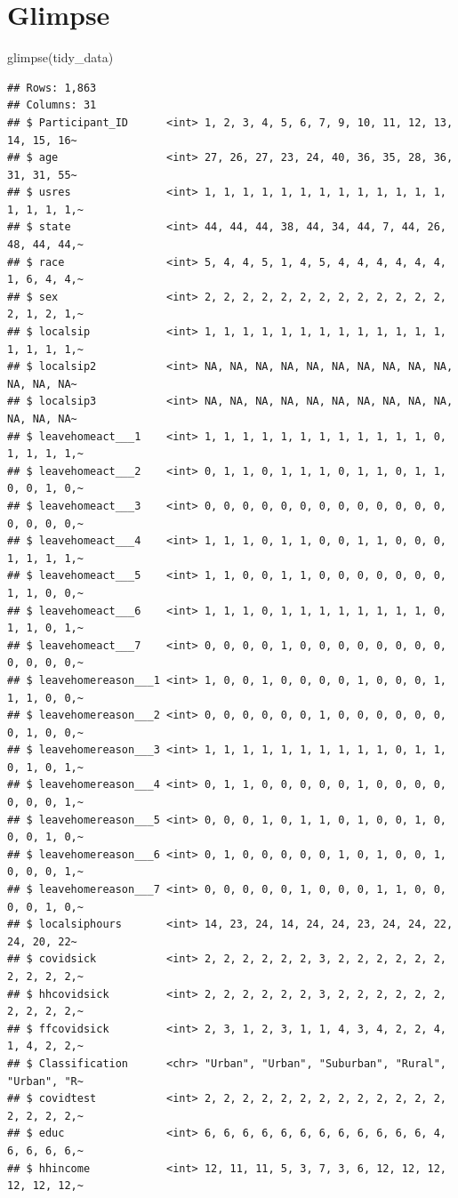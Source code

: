 \documentclass[
  11 pt,
]{article}
\newenvironment{Shaded}{\begin{snugshade}}{\end{snugshade}}
\newcommand{\FunctionTok}[1]{\textcolor[rgb]{0.00,0.00,0.00}{#1}}
\newcommand{\NormalTok}[1]{#1}
\begin{document}
\hypertarget{glimpse}{%
\section{Glimpse}\label{glimpse}}

\begin{Shaded}
\begin{Highlighting}[]
\FunctionTok{glimpse}\NormalTok{(tidy\_data)}
\end{Highlighting}
\end{Shaded}

\begin{verbatim}
## Rows: 1,863
## Columns: 31
## $ Participant_ID      <int> 1, 2, 3, 4, 5, 6, 7, 9, 10, 11, 12, 13, 14, 15, 16~
## $ age                 <int> 27, 26, 27, 23, 24, 40, 36, 35, 28, 36, 31, 31, 55~
## $ usres               <int> 1, 1, 1, 1, 1, 1, 1, 1, 1, 1, 1, 1, 1, 1, 1, 1, 1,~
## $ state               <int> 44, 44, 44, 38, 44, 34, 44, 7, 44, 26, 48, 44, 44,~
## $ race                <int> 5, 4, 4, 5, 1, 4, 5, 4, 4, 4, 4, 4, 4, 1, 6, 4, 4,~
## $ sex                 <int> 2, 2, 2, 2, 2, 2, 2, 2, 2, 2, 2, 2, 2, 2, 1, 2, 1,~
## $ localsip            <int> 1, 1, 1, 1, 1, 1, 1, 1, 1, 1, 1, 1, 1, 1, 1, 1, 1,~
## $ localsip2           <int> NA, NA, NA, NA, NA, NA, NA, NA, NA, NA, NA, NA, NA~
## $ localsip3           <int> NA, NA, NA, NA, NA, NA, NA, NA, NA, NA, NA, NA, NA~
## $ leavehomeact___1    <int> 1, 1, 1, 1, 1, 1, 1, 1, 1, 1, 1, 1, 0, 1, 1, 1, 1,~
## $ leavehomeact___2    <int> 0, 1, 1, 0, 1, 1, 1, 0, 1, 1, 0, 1, 1, 0, 0, 1, 0,~
## $ leavehomeact___3    <int> 0, 0, 0, 0, 0, 0, 0, 0, 0, 0, 0, 0, 0, 0, 0, 0, 0,~
## $ leavehomeact___4    <int> 1, 1, 1, 0, 1, 1, 0, 0, 1, 1, 0, 0, 0, 1, 1, 1, 1,~
## $ leavehomeact___5    <int> 1, 1, 0, 0, 1, 1, 0, 0, 0, 0, 0, 0, 0, 1, 1, 0, 0,~
## $ leavehomeact___6    <int> 1, 1, 1, 0, 1, 1, 1, 1, 1, 1, 1, 1, 0, 1, 1, 0, 1,~
## $ leavehomeact___7    <int> 0, 0, 0, 0, 1, 0, 0, 0, 0, 0, 0, 0, 0, 0, 0, 0, 0,~
## $ leavehomereason___1 <int> 1, 0, 0, 1, 0, 0, 0, 0, 1, 0, 0, 0, 1, 1, 1, 0, 0,~
## $ leavehomereason___2 <int> 0, 0, 0, 0, 0, 0, 1, 0, 0, 0, 0, 0, 0, 0, 1, 0, 0,~
## $ leavehomereason___3 <int> 1, 1, 1, 1, 1, 1, 1, 1, 1, 1, 0, 1, 1, 0, 1, 0, 1,~
## $ leavehomereason___4 <int> 0, 1, 1, 0, 0, 0, 0, 0, 1, 0, 0, 0, 0, 0, 0, 0, 1,~
## $ leavehomereason___5 <int> 0, 0, 0, 1, 0, 1, 1, 0, 1, 0, 0, 1, 0, 0, 0, 1, 0,~
## $ leavehomereason___6 <int> 0, 1, 0, 0, 0, 0, 0, 1, 0, 1, 0, 0, 1, 0, 0, 0, 1,~
## $ leavehomereason___7 <int> 0, 0, 0, 0, 0, 1, 0, 0, 0, 1, 1, 0, 0, 0, 0, 1, 0,~
## $ localsiphours       <int> 14, 23, 24, 14, 24, 24, 23, 24, 24, 22, 24, 20, 22~
## $ covidsick           <int> 2, 2, 2, 2, 2, 2, 3, 2, 2, 2, 2, 2, 2, 2, 2, 2, 2,~
## $ hhcovidsick         <int> 2, 2, 2, 2, 2, 2, 3, 2, 2, 2, 2, 2, 2, 2, 2, 2, 2,~
## $ ffcovidsick         <int> 2, 3, 1, 2, 3, 1, 1, 4, 3, 4, 2, 2, 4, 1, 4, 2, 2,~
## $ Classification      <chr> "Urban", "Urban", "Suburban", "Rural", "Urban", "R~
## $ covidtest           <int> 2, 2, 2, 2, 2, 2, 2, 2, 2, 2, 2, 2, 2, 2, 2, 2, 2,~
## $ educ                <int> 6, 6, 6, 6, 6, 6, 6, 6, 6, 6, 6, 6, 4, 6, 6, 6, 6,~
## $ hhincome            <int> 12, 11, 11, 5, 3, 7, 3, 6, 12, 12, 12, 12, 12, 12,~
\end{verbatim}
\end{document}
